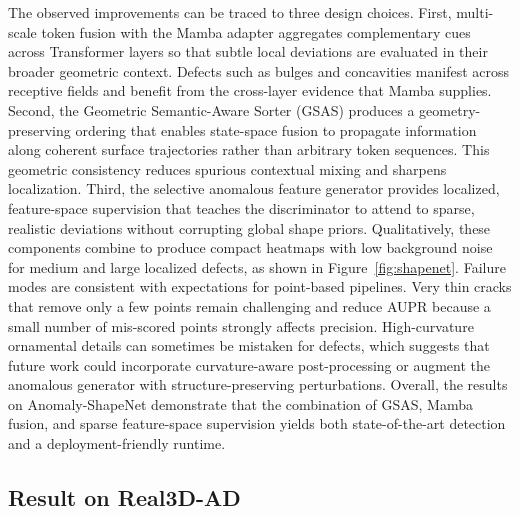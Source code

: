 The observed improvements can be traced to three design choices. First, multi-scale token fusion with the Mamba adapter aggregates complementary cues across Transformer layers so that subtle local deviations are evaluated in their broader geometric context. Defects such as bulges and concavities manifest across receptive fields and benefit from the cross-layer evidence that Mamba supplies. Second, the Geometric Semantic-Aware Sorter (GSAS) produces a geometry-preserving ordering that enables state-space fusion to propagate information along coherent surface trajectories rather than arbitrary token sequences. This geometric consistency reduces spurious contextual mixing and sharpens localization. Third, the selective anomalous feature generator provides localized, feature-space supervision that teaches the discriminator to attend to sparse, realistic deviations without corrupting global shape priors. Qualitatively, these components combine to produce compact heatmaps with low background noise for medium and large localized defects, as shown in Figure~\ref{fig:shapenet}. Failure modes are consistent with expectations for point-based pipelines. Very thin cracks that remove only a few points remain challenging and reduce AUPR because a small number of mis-scored points strongly affects precision. High-curvature ornamental details can sometimes be mistaken for defects, which suggests that future work could incorporate curvature-aware post-processing or augment the anomalous generator with structure-preserving perturbations. Overall, the results on Anomaly-ShapeNet demonstrate that the combination of GSAS, Mamba fusion, and sparse feature-space supervision yields both state-of-the-art detection and a deployment-friendly runtime.

\subsection{Result on Real3D-AD}

